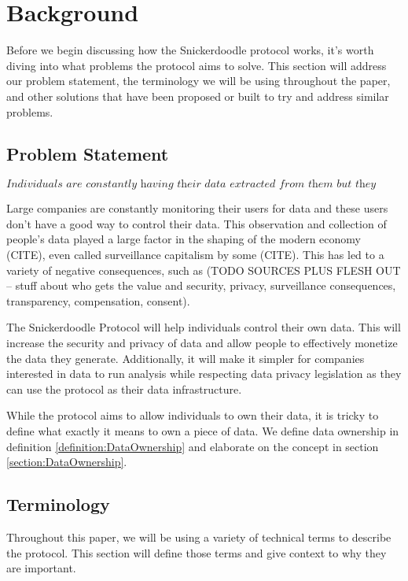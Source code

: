 \section{Background}
Before we begin discussing how the Snickerdoodle protocol works, it's worth diving into what problems the protocol aims to solve. This section will address our problem statement, the terminology we will be using throughout the paper, and other solutions that have been proposed or built to try and address similar problems.

\subsection{Problem Statement}


     

$$\textit{Individuals are constantly having their data extracted from them but they don't own that data}$$

Large companies are constantly monitoring their users for data and these users don't have a good way to control their data. This observation and collection of people's data played a large factor in the shaping of the modern economy (CITE), even called surveillance capitalism by some (CITE). This has led to a variety of negative consequences, such as (TODO SOURCES PLUS FLESH OUT -- stuff about who gets the value and security, privacy, surveillance consequences, transparency, compensation, consent). 

The Snickerdoodle Protocol will help individuals control their own data. This will increase the security and privacy of data and allow people to effectively monetize the data they generate. Additionally, it will make it simpler for companies interested in data to run analysis while respecting data privacy legislation as they can use the protocol as their data infrastructure. 

While the protocol aims to allow individuals to own their data, it is tricky to define what exactly it means to own a piece of data. We define data ownership in definition \ref{definition:DataOwnership} and elaborate on the concept in section \ref{section:DataOwnership}.



\subsection{Terminology}
Throughout this paper, we will be using a variety of technical terms to describe the protocol. This section will define those terms and give context to why they are important.
